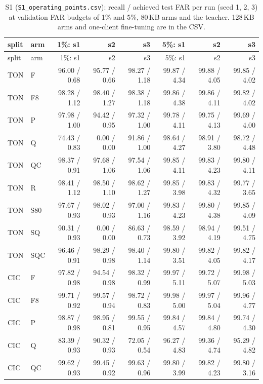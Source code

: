 \documentclass[10pt]{article}
\begin{document}
{\scriptsize
\begin{longtable}{llrrrrrr}
\caption{S1 (\texttt{S1\_operating\_points.csv}): recall / achieved test FAR per run (seed 1, 2, 3) at validation FAR budgets of 1\% and 5\%, 80\,KB arms and the teacher. 128\,KB arms and one-client fine-tuning are in the CSV.}\\
\toprule
split & arm & 1\%: s1 & s2 & s3 & 5\%: s1 & s2 & s3 \\
\midrule
\endfirsthead
\toprule
split & arm & 1\%: s1 & s2 & s3 & 5\%: s1 & s2 & s3 \\
\midrule
\endhead
\bottomrule
\endlastfoot
TON & F & 96.00 / 0.68 & 95.77 / 0.66 & 98.27 / 1.18 & 99.87 / 4.34 & 99.88 / 4.05 & 99.85 / 4.02 \\
TON & F8 & 98.28 / 1.12 & 98.40 / 1.27 & 98.38 / 1.18 & 99.86 / 4.38 & 99.86 / 4.11 & 99.82 / 4.02 \\
TON & P & 97.98 / 1.00 & 94.42 / 0.95 & 97.32 / 1.00 & 99.78 / 4.11 & 99.75 / 4.13 & 99.69 / 4.00 \\
TON & Q & 74.43 / 0.83 & 0.00 / 0.00 & 91.86 / 1.00 & 98.64 / 4.27 & 98.91 / 3.80 & 98.72 / 4.48 \\
TON & QC & 98.37 / 0.91 & 97.68 / 1.06 & 97.54 / 1.06 & 99.85 / 4.11 & 99.83 / 4.23 & 99.80 / 4.11 \\
TON & R & 98.41 / 1.12 & 98.50 / 1.10 & 98.62 / 1.27 & 99.85 / 3.98 & 99.83 / 4.32 & 99.77 / 3.65 \\
TON & S80 & 97.67 / 0.93 & 98.02 / 0.93 & 97.00 / 1.16 & 99.83 / 4.23 & 99.80 / 4.38 & 99.85 / 4.09 \\
TON & SQ & 90.31 / 0.93 & 0.00 / 0.00 & 86.63 / 0.73 & 98.59 / 3.92 & 98.94 / 4.19 & 99.51 / 4.75 \\
TON & SQC & 96.46 / 0.91 & 98.29 / 0.98 & 98.40 / 1.14 & 99.80 / 3.51 & 99.82 / 4.05 & 99.82 / 4.17 \\
CIC & F & 97.82 / 0.98 & 94.54 / 0.98 & 98.32 / 0.99 & 99.97 / 5.11 & 99.72 / 5.07 & 99.98 / 5.03 \\
CIC & F8 & 99.71 / 0.92 & 99.57 / 0.94 & 98.72 / 0.83 & 99.98 / 5.00 & 99.97 / 5.04 & 99.96 / 4.77 \\
CIC & P & 98.87 / 0.98 & 98.95 / 0.81 & 99.55 / 0.95 & 99.84 / 4.57 & 99.84 / 4.80 & 99.74 / 4.30 \\
CIC & Q & 83.39 / 0.93 & 90.32 / 0.93 & 72.05 / 0.54 & 96.27 / 4.83 & 99.36 / 4.74 & 95.29 / 4.82 \\
CIC & QC & 99.62 / 0.93 & 99.45 / 0.92 & 99.63 / 0.96 & 99.80 / 3.99 & 99.82 / 4.23 & 99.80 / 3.16 \\

\end{longtable}}
\end{document}
